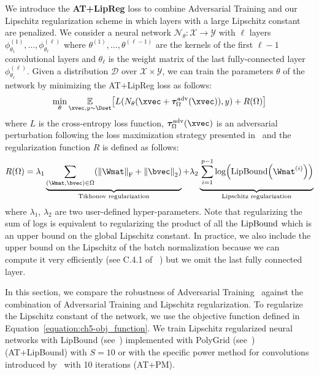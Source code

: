 We introduce the \textbf{AT+LipReg} loss to combine Adversarial Training and our Lipschitz regularization scheme in which layers with a large Lipschitz constant are penalized.
We consider a neural network $\mathcal N_\theta : \mathcal X \rightarrow \mathcal Y$ with $\ell$ layers $\phi^{(1)}_{\theta_1}, \dots, \phi^{(\ell)}_{\theta_\ell}$ where $\theta^{(1)}, \dots, \theta^{(\ell -1)}$ are the kernels of the first $\ell - 1$ convolutional layers and $\theta_\ell$ is the weight matrix of the last fully-connected  layer $\phi^{(\ell)}_{\theta_\ell}$.
Given a distribution $\mathcal D$ over $\mathcal X \times \mathcal Y$, we can train the parameters $\theta$ of the network by minimizing the AT+LipReg loss as follows:
\begin{equation} \label{equation:ch5-obj_function}
  \min_{\theta} \Ebb_{\xvec,y \sim \Dset} \left[ L(N_\theta(\xvec + \adv^{\text{adv}}_\Omega(\xvec)), y) + R(\Omega) \right]
\end{equation}
where $L$ is the cross-entropy loss function, $\adv^{\text{adv}}_\Omega(\xvec)$ is an adversarial perturbation following the loss maximization strategy presented in~ and the regularization function $R$ is defined as follows:
\begin{equation}
  R(\Omega) =  \lambda_1 \underbrace{\sum_{(\Wmat, \bvec) \in \Omega} \left( \norm{\Wmat}_\fro + \norm{\bvec}_2 \right)}_{
  \text{Tikhonov regularization}} + \lambda_2 \underbrace{\vphantom{\sum_{(\Wmat, \bvec) \in \Omega}} \sum_{i=1}^{\depth-1} \log\left(\lipbound\left(\Wmat^{(i)}\right)\right)}_{\text{Lipschitz regularization}} 
\end{equation}
where $\lambda_1$, $\lambda_2$ are two user-defined hyper-parameters.
Note that regularizing the sum of logs is equivalent to regularizing the product of all the $\mathrm{LipBound}$ which is an upper bound on the global Lipschitz constant.
In practice, we also include the upper bound on the Lipschitz of the batch normalization because we can compute it very efficiently (see C.4.1 of ~\citet{tsuzuku2018lipschitz}) but we omit the last fully connected layer.

In this section, we compare the robustness of Adversarial Training~\cite{goodfellow2014explaining, madry2018towards} against the combination of Adversarial Training and Lipschitz regularization.
To regularize the Lipschitz constant of the network, we use the objective function defined in Equation~\ref{equation:ch5-obj_function}.
We train Lipschitz regularized neural networks with LipBound (see~) implemented with PolyGrid (see~) (AT+LipBound) with $S = 10$ or with the specific power method for convolutions introduced by~\citet{farnia2018generalizable} with 10 iterations (AT+PM).

